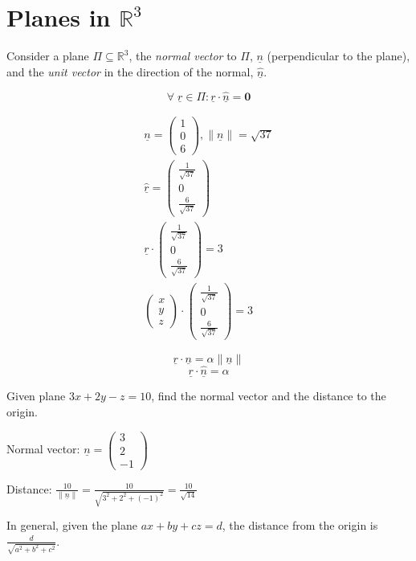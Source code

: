 \documentclass[00_complete]{subfiles}
\begin{document}
\section{Planes in \texorpdfstring{$\mathbb{R}^3$}{R3}}

Consider a plane $\Pi \subseteq \mathbb{R}^3$, the \emph{normal vector} to $\Pi$,
$\underline n$ (perpendicular to the plane), and the \emph{unit vector} in the direction of the normal,
$\underline{\hat n}$.

$$\forall \; \underline r \in \Pi : \underline r \cdot
\underline{\hat n} = \mathbf 0$$

\begin{example}

$$
\begin{gathered}
    \underline n = \begin{pmatrix}
        1\\0\\6
    \end{pmatrix}, \|\underline n\| = \sqrt{37} \\
    \underline{\hat r} = \begin{pmatrix}
        \frac{1}{\sqrt{37}} \\
        0 \\
        \frac{6}{\sqrt{37}}
    \end{pmatrix} \\
    \underline r \cdot \begin{pmatrix}
        \frac{1}{\sqrt{37}} \\
        0 \\
        \frac{6}{\sqrt{37}}
    \end{pmatrix} = 3 \\
    \begin{pmatrix}
        x\\y\\z
    \end{pmatrix} \cdot \begin{pmatrix}
        \frac{1}{\sqrt{37}} \\
        0 \\
        \frac{6}{\sqrt{37}}
    \end{pmatrix} = 3
\end{gathered}
$$

$$\underline r \cdot \underline n = \alpha \|\underline n\|$$
$$\underline r \cdot \underline{\hat n} = \alpha$$

Given plane $3x+2y-z=10$, find the normal vector and the distance to the
origin.

Normal vector: $\underline n = \begin{pmatrix}
    3\\2\\-1
\end{pmatrix}$

Distance: $\frac{10}{\|\underline n\|} = \frac{10}{\sqrt{3^2+2^2+(-1)^2}} = \frac{10}{\sqrt{14}}$

\end{example}
In general, given the plane $ax+by+cz = d$, the distance from the origin is $\frac{d}{\sqrt{a^2+b^2+c^2}}$.
\end{document}
